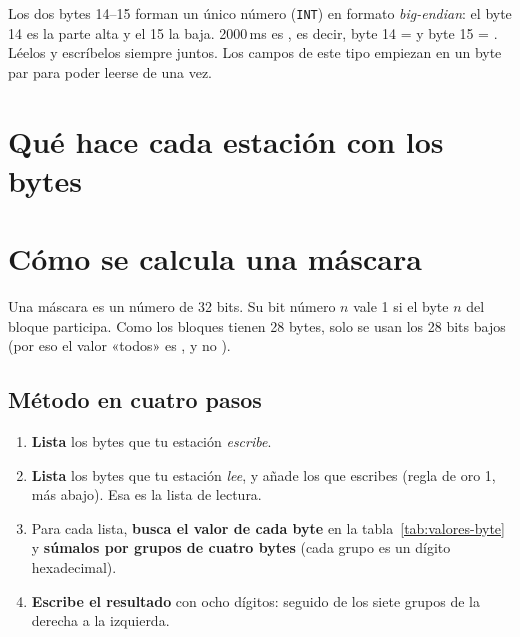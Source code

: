 {\small\setlength{\tabcolsep}{3.2pt}

}

\begin{ojo}
Los dos bytes 14--15 forman un único número (\texttt{INT}) en formato \emph{big-endian}: el byte 14 es la parte alta y el 15 la baja. 2000\,ms es , es decir, byte 14 =  y byte 15 = . Léelos y escríbelos siempre juntos. Los campos de este tipo empiezan en un byte par para poder leerse de una vez.
\end{ojo}

\section{Qué hace cada estación con los bytes}


\section{Cómo se calcula una máscara}\label{sec:calculo-mascara}
Una máscara es un número de 32 bits. Su bit número $n$ vale 1 si el byte $n$ del bloque participa. Como los bloques tienen 28 bytes, solo se usan los 28 bits bajos (por eso el valor «todos» es , y no ).

\subsection*{Método en cuatro pasos}
\begin{enumerate}
\item \textbf{Lista} los bytes que tu estación \emph{escribe}.
\item \textbf{Lista} los bytes que tu estación \emph{lee}, y añade los que escribes (regla de oro 1, más abajo). Esa es la lista de lectura.
\item Para cada lista, \textbf{busca el valor de cada byte} en la tabla~\ref{tab:valores-byte} y \textbf{súmalos por grupos de cuatro bytes} (cada grupo es un dígito hexadecimal).
\item \textbf{Escribe el resultado} con ocho dígitos:  seguido de los siete grupos de la derecha a la izquierda.
\end{enumerate}

